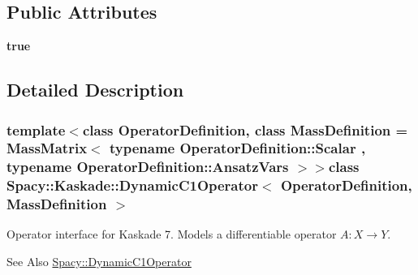 \subsection*{Public Attributes}
\begin{DoxyCompactItemize}
\item 
{\bfseries true}
\end{DoxyCompactItemize}


\subsection{Detailed Description}
\subsubsection*{template$<$class Operator\-Definition, class Mass\-Definition = Mass\-Matrix$<$ typename Operator\-Definition\-::\-Scalar , typename Operator\-Definition\-::\-Ansatz\-Vars $>$$>$class Spacy\-::\-Kaskade\-::\-Dynamic\-C1\-Operator$<$ Operator\-Definition, Mass\-Definition $>$}

Operator interface for Kaskade 7. Models a differentiable operator $A:X\rightarrow Y$. 

\begin{DoxySeeAlso}{See Also}
\hyperlink{classSpacy_1_1DynamicC1Operator}{Spacy\-::\-Dynamic\-C1\-Operator} 
\end{DoxySeeAlso}


